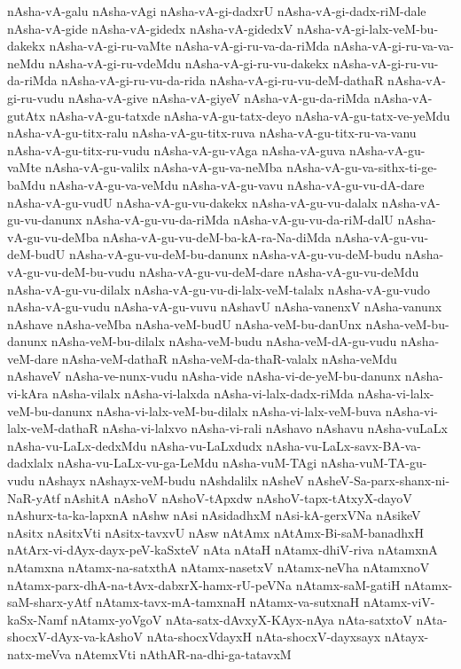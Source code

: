 {nAsha-vA-galu
nAsha-vAgi
nAsha-vA-gi-dadxrU
nAsha-vA-gi-dadx-riM-dale
nAsha-vA-gide
nAsha-vA-gidedx
nAsha-vA-gidedxV
nAsha-vA-gi-lalx-veM-bu-dakekx
nAsha-vA-gi-ru-vaMte
nAsha-vA-gi-ru-va-da-riMda
nAsha-vA-gi-ru-va-va-neMdu
nAsha-vA-gi-ru-vdeMdu
nAsha-vA-gi-ru-vu-dakekx
nAsha-vA-gi-ru-vu-da-riMda
nAsha-vA-gi-ru-vu-da-rida
nAsha-vA-gi-ru-vu-deM-dathaR
nAsha-vA-gi-ru-vudu
nAsha-vA-give
nAsha-vA-giyeV
nAsha-vA-gu-da-riMda
nAsha-vA-gutAtx
nAsha-vA-gu-tatxde
nAsha-vA-gu-tatx-deyo
nAsha-vA-gu-tatx-ve-yeMdu
nAsha-vA-gu-titx-ralu
nAsha-vA-gu-titx-ruva
nAsha-vA-gu-titx-ru-va-vanu
nAsha-vA-gu-titx-ru-vudu
nAsha-vA-gu-vAga
nAsha-vA-guva
nAsha-vA-gu-vaMte
nAsha-vA-gu-valilx
nAsha-vA-gu-va-neMba
nAsha-vA-gu-va-sithx-ti-ge-baMdu
nAsha-vA-gu-va-veMdu
nAsha-vA-gu-vavu
nAsha-vA-gu-vu-dA-dare
nAsha-vA-gu-vudU
nAsha-vA-gu-vu-dakekx
nAsha-vA-gu-vu-dalalx
nAsha-vA-gu-vu-danunx
nAsha-vA-gu-vu-da-riMda
nAsha-vA-gu-vu-da-riM-dalU
nAsha-vA-gu-vu-deMba
nAsha-vA-gu-vu-deM-ba-kA-ra-Na-diMda
nAsha-vA-gu-vu-deM-budU
nAsha-vA-gu-vu-deM-bu-danunx
nAsha-vA-gu-vu-deM-budu
nAsha-vA-gu-vu-deM-bu-vudu
nAsha-vA-gu-vu-deM-dare
nAsha-vA-gu-vu-deMdu
nAsha-vA-gu-vu-dilalx
nAsha-vA-gu-vu-di-lalx-veM-talalx
nAsha-vA-gu-vudo
nAsha-vA-gu-vudu
nAsha-vA-gu-vuvu
nAshavU
nAsha-vanenxV
nAsha-vanunx
nAshave
nAsha-veMba
nAsha-veM-budU
nAsha-veM-bu-danUnx
nAsha-veM-bu-danunx
nAsha-veM-bu-dilalx
nAsha-veM-budu
nAsha-veM-dA-gu-vudu
nAsha-veM-dare
nAsha-veM-dathaR
nAsha-veM-da-thaR-valalx
nAsha-veMdu
nAshaveV
nAsha-ve-nunx-vudu
nAsha-vide
nAsha-vi-de-yeM-bu-danunx
nAsha-vi-kAra
nAsha-vilalx
nAsha-vi-lalxda
nAsha-vi-lalx-dadx-riMda
nAsha-vi-lalx-veM-bu-danunx
nAsha-vi-lalx-veM-bu-dilalx
nAsha-vi-lalx-veM-buva
nAsha-vi-lalx-veM-dathaR
nAsha-vi-lalxvo
nAsha-vi-rali
nAshavo
nAshavu
nAsha-vuLaLx
nAsha-vu-LaLx-dedxMdu
nAsha-vu-LaLxdudx
nAsha-vu-LaLx-savx-BA-va-dadxlalx
nAsha-vu-LaLx-vu-ga-LeMdu
nAsha-vuM-TAgi
nAsha-vuM-TA-gu-vudu
nAshayx
nAshayx-veM-budu
nAshdalilx
nAsheV
nAsheV-Sa-parx-shanx-ni-NaR-yAtf
nAshitA
nAshoV
nAshoV-tApxdw
nAshoV-tapx-tAtxyX-dayoV
nAshurx-ta-ka-lapxnA
nAshw
nAsi
nAsidadhxM
nAsi-kA-gerxVNa
nAsikeV
nAsitx
nAsitxVti
nAsitx-tavxvU
nAsw
nAtAmx
nAtAmx-Bi-saM-banadhxH
nAtArx-vi-dAyx-dayx-peV-kaSxteV
nAta
nAtaH
nAtamx-dhiV-riva
nAtamxnA
nAtamxna
nAtamx-na-satxthA
nAtamx-nasetxV
nAtamx-neVha
nAtamxnoV
nAtamx-parx-dhA-na-tAvx-dabxrX-hamx-rU-peVNa
nAtamx-saM-gatiH
nAtamx-saM-sharx-yAtf
nAtamx-tavx-mA-tamxnaH
nAtamx-va-sutxnaH
nAtamx-viV-kaSx-Namf
nAtamx-yoVgoV
nAta-satx-dAvxyX-KAyx-nAya
nAta-satxtoV
nAta-shocxV-dAyx-va-kAshoV
nAta-shocxVdayxH
nAta-shocxV-dayxsayx
nAtayx-natx-meVva
nAtemxVti
nAthAR-na-dhi-ga-tatavxM
}
